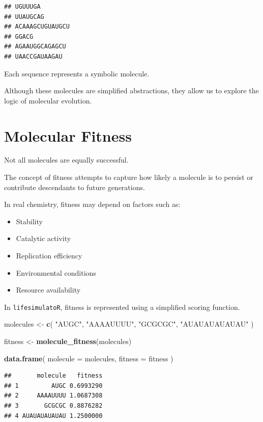\documentclass[
  oneside,
  openany]{book}
\newenvironment{Shaded}{\begin{snugshade}}{\end{snugshade}}
\newcommand{\AttributeTok}[1]{\textcolor[rgb]{0.13,0.29,0.53}{#1}}
\newcommand{\FunctionTok}[1]{\textcolor[rgb]{0.13,0.29,0.53}{\textbf{#1}}}
\newcommand{\NormalTok}[1]{#1}
\newcommand{\OtherTok}[1]{\textcolor[rgb]{0.56,0.35,0.01}{#1}}
\newcommand{\StringTok}[1]{\textcolor[rgb]{0.31,0.60,0.02}{#1}}
\providecommand{\tightlist}{%
  \setlength{\itemsep}{0pt}\setlength{\parskip}{0pt}}
\begin{document}
\begin{verbatim}
## UGUUUGA
## UUAUGCAG
## ACAAAGCUGUAUGCU
## GGACG
## AGAAUGGCAGAGCU
## UAACCGAUAAGAU
\end{verbatim}

Each sequence represents a symbolic molecule.

Although these molecules are simplified abstractions, they allow us to explore the logic of molecular evolution.

\section{Molecular Fitness}\label{molecular-fitness}

Not all molecules are equally successful.

The concept of fitness attempts to capture how likely a molecule is to persist or contribute descendants to future generations.

In real chemistry, fitness may depend on factors such as:

\begin{itemize}
\tightlist
\item
  Stability
\item
  Catalytic activity
\item
  Replication efficiency
\item
  Environmental conditions
\item
  Resource availability
\end{itemize}

In \texttt{lifesimulatoR}, fitness is represented using a simplified scoring function.

\begin{Shaded}
\begin{Highlighting}[]
\NormalTok{molecules }\OtherTok{\textless{}{-}} \FunctionTok{c}\NormalTok{(}
  \StringTok{"AUGC"}\NormalTok{,}
  \StringTok{"AAAAUUUU"}\NormalTok{,}
  \StringTok{"GCGCGC"}\NormalTok{,}
  \StringTok{"AUAUAUAUAUAU"}
\NormalTok{)}

\NormalTok{fitness }\OtherTok{\textless{}{-}} \FunctionTok{molecule\_fitness}\NormalTok{(molecules)}

\FunctionTok{data.frame}\NormalTok{(}
  \AttributeTok{molecule =}\NormalTok{ molecules,}
  \AttributeTok{fitness =}\NormalTok{ fitness}
\NormalTok{)}
\end{Highlighting}
\end{Shaded}

\begin{verbatim}
##       molecule   fitness
## 1         AUGC 0.6993290
## 2     AAAAUUUU 1.0687308
## 3       GCGCGC 0.8876282
## 4 AUAUAUAUAUAU 1.2500000
\end{verbatim}
\end{document}
